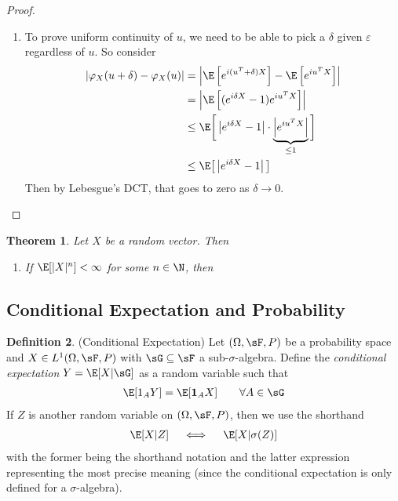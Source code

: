 \documentclass[12pt]{article}
\theoremstyle{plain}
\newtheorem{thm}{Theorem}[section]
\theoremstyle{definition}
\newtheorem{defn}[thm]{Definition}
\theoremstyle{remark}
\newcommand{\ra}{\rightarrow}
\newcommand{\one}[1]{\mathbf{1}_{#1}}
\begin{document}
\begin{proof}
\begin{enumerate}[label=(\roman*)]
  \item To prove uniform continuity of $u$, we need to be able to pick a
    $\delta$ given $\varepsilon$ regardless of $u$. So consider
    \begin{align*}
      \left\lvert
      \varphi_X(u+\delta) - \varphi_X(u)
      \right\rvert
      &=
      \left\lvert
      \E\left[e^{i(u^T+\delta)X}\right] - \E\left[e^{iu^TX}\right]
      \right\rvert \\
      &=
      \left\lvert
      \E\left[(e^{i\delta X}-1)e^{iu^TX}\right]
      \right\rvert \\
      &\leq
      \E\bigg[
      \left\lvert
      e^{i\delta X}-1
      \right\rvert
      \cdot
      \underbrace{\left\lvert e^{iu^TX} \right\rvert}_{\leq 1}
      \bigg]
      \\
      &\leq
      \E\big[
      \left\lvert
      e^{i\delta X}-1
      \right\rvert
      \big]
    \end{align*}
    Then by Lebesgue's DCT, that goes to zero as $\delta\ra 0$.
\end{enumerate}
\end{proof}

\begin{thm}
Let $X$ be a random vector. Then
\begin{enumerate}[label=\emph{(\roman*)}]
  \item If $\E[|X|^n]<\infty$ for some $n\in\N$, then
\end{enumerate}
\end{thm}


\clearpage
\subsection{Conditional Expectation and Probability}

\begin{defn}(Conditional Expectation)
Let $(\Omega,\sF,P)$ be a probability space and $X\in L^1(\Omega,\sF,P)$
with $\sG\subseteq\sF$ a sub-$\sigma$-algebra. Define the
\emph{conditional expectation} $Y=\E[X|\sG]$ as a random variable such
that
\begin{align*}
  \E[1_AY] = \E[\one{A}X]
  \qquad \forall A\in \sG
\end{align*}
If $Z$ is another random variable on $(\Omega,\sF,P)$, then we use the
shorthand
\begin{align*}
  \E[X|Z]
  \quad\iff\quad
  \E[X|\sigma(Z)]
\end{align*}
with the former being the shorthand notation and the latter expression
representing the most precise meaning (since the conditional
expectation is only defined for a $\sigma$-algebra).
\end{defn}
\end{document}
